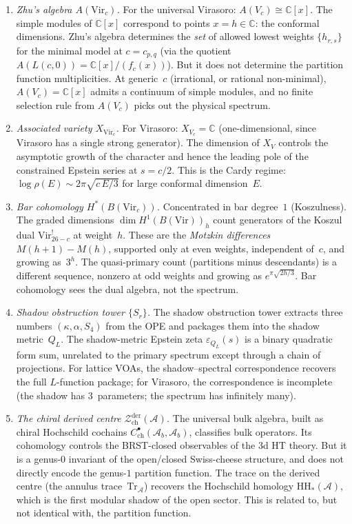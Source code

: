 \documentclass[11pt]{article}
\newcommand{\cA}{\mathcal{A}}
\newcommand{\cZ}{\mathcal{Z}}
\newcommand{\C}{\mathbb{C}}
\begin{document}
\begin{enumerate}
\item \emph{Zhu's algebra $A(\mathrm{Vir}_c)$.}
  For the universal Virasoro: $A(V_c) \cong \C[x]$.  The simple
  modules of $\C[x]$ correspond to points $x = h \in \C$: the
  conformal dimensions.  Zhu's algebra determines the
  \emph{set} of allowed lowest weights $\{h_{r,s}\}$ for the
  minimal model at $c = c_{p,q}$ (via the quotient $A(L(c,0))
  = \C[x]/(f_c(x))$).  But it does not determine the partition
  function multiplicities.  At generic~$c$ (irrational, or
  rational non-minimal), $A(V_c) = \C[x]$ admits a continuum
  of simple modules, and no finite selection rule from $A(V_c)$
  picks out the physical spectrum.

\item \emph{Associated variety $X_{\mathrm{Vir}_c}$.}
  For Virasoro: $X_{V_c} = \C$ (one-dimensional, since Virasoro
  has a single strong generator).  The dimension of $X_V$
  controls the asymptotic growth of the character and hence the
  leading pole of the constrained Epstein series at $s = c/2$.
  This is the Cardy regime: $\log \rho(E) \sim
  2\pi\sqrt{c\,E/3}$ for large conformal dimension~$E$.

\item \emph{Bar cohomology $H^*(B(\mathrm{Vir}_c))$.}
  Concentrated in bar degree~$1$ (Koszulness).  The graded
  dimensions $\dim H^1(B(\mathrm{Vir}))_h$ count generators of
  the Koszul dual $\mathrm{Vir}^!_{26-c}$ at weight~$h$.  These
  are the \emph{Motzkin differences} $M(h+1) - M(h)$, supported
  only at even weights, independent of~$c$, and growing
  as~$3^h$.  The quasi-primary count (partitions minus
  descendants) is a different sequence, nonzero at odd weights
  and growing as $e^{\pi\sqrt{2h/3}}$.  Bar cohomology sees the
  dual algebra, not the spectrum.

\item \emph{Shadow obstruction tower $\{S_r\}$.}
  The shadow obstruction tower extracts three numbers $(\kappa, \alpha, S_4)$
  from the OPE and packages them into the shadow metric~$Q_L$.
  The shadow-metric Epstein zeta $\varepsilon_{Q_L}(s)$ is a
  binary quadratic form sum, unrelated to the primary spectrum
  except through a chain of projections.  For lattice VOAs, the
  shadow--spectral correspondence recovers the full $L$-function
  package; for Virasoro, the correspondence is incomplete (the
  shadow has $3$~parameters; the spectrum has infinitely many).

\item \emph{The chiral derived centre
  $\cZ^{\mathrm{der}}_{\mathrm{ch}}(\cA)$.}
  The universal bulk algebra, built as chiral Hochschild cochains
  $C^\bullet_{\mathrm{ch}}(\cA_b, \cA_b)$, classifies bulk
  operators.  Its cohomology controls the BRST-closed observables
  of the 3d HT theory.  But it is a genus-$0$ invariant of the
  open/closed Swiss-cheese structure, and does not directly encode
  the genus-$1$ partition function.  The trace on the derived
  centre (the annulus trace~$\mathrm{Tr}_\cA$) recovers the
  Hochschild homology $\mathrm{HH}_*(\cA)$, which is the first
  modular shadow of the open sector.  This is related to, but
  not identical with, the partition function.
\end{enumerate}
\end{document}
